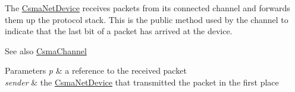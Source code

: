 The \hyperlink{classns3_1_1CsmaNetDevice}{Csma\+Net\+Device} receives packets from its connected channel and forwards them up the protocol stack. This is the public method used by the channel to indicate that the last bit of a packet has arrived at the device.

\begin{DoxySeeAlso}{See also}
\hyperlink{classns3_1_1CsmaChannel}{Csma\+Channel} 
\end{DoxySeeAlso}

\begin{DoxyParams}{Parameters}
{\em p} & a reference to the received packet \\
\hline
{\em sender} & the \hyperlink{classns3_1_1CsmaNetDevice}{Csma\+Net\+Device} that transmitted the packet in the first place \\
\hline
\end{DoxyParams}

